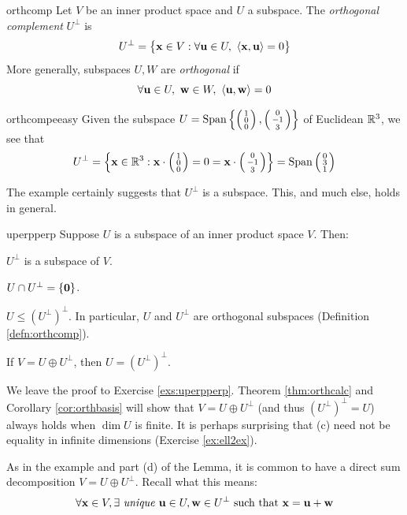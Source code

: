 \begin{defn}{}{orthcomp}
	Let $V$ be an inner product space and $U$ a subspace. The \emph{orthogonal complement} $U^\perp$ is
	\[
		U^\perp =\big\{{\mathbf{x}}\in V:\forall{\mathbf{u}}\in U,\ \left\langle {\mathbf{x}},{\mathbf{u}}\right\rangle=0\big\}
	\]
	More generally, subspaces $U,W$ are \emph{orthogonal} if
	\[
		\forall {\mathbf{u}}\in U,\ {\mathbf{w}}\in W,\ \left\langle {\mathbf{u}},{\mathbf{w}}\right\rangle=0
	\]
\end{defn}


\begin{example}{}{orthcompeeasy}
	Given the subspace $U=\operatorname{Span}\left\{\left(\begin{smallmatrix}1\\0\\0\end{smallmatrix}\right),\left(\begin{smallmatrix}0\\-1\\3\end{smallmatrix}\right)\right\}$ of Euclidean $\mathbb{R}^3$, we see that
	\[
		U^\perp
		=\left\{ {\mathbf{x}}\in\mathbb{R}^3:{\mathbf{x}}\cdot\left(\begin{smallmatrix}1\\0\\0\end{smallmatrix}\right)=0={\mathbf{x}}\cdot\left(\begin{smallmatrix}0\\-1\\3\end{smallmatrix}\right)\right\}
		=\operatorname{Span}\left(\begin{smallmatrix}0\\3\\1\end{smallmatrix}\right)
	\]
\end{example}

The example certainly suggests that $U^\perp$ is a subspace. This, and much else, holds in general.

\begin{lemm}{}{uperpperp}
	Suppose $U$ is a subspace of an inner product space $V$. Then:
	\begin{enumeratea}
    \item $U^\perp$ is a subspace of $V$.
    \item $U\cap U^\perp=\{\mathbf{0}\}$.
    \item $U\le (U^\perp)^\perp$. In particular, $U$ and $U^\perp$ are orthogonal subspaces (Definition \ref{defn:orthcomp}).
    \item If $V=U\oplus U^\perp$, then $U=(U^\perp)^\perp$.
	\end{enumeratea}
\end{lemm}

We leave the proof to Exercise \ref{exs:uperpperp}. Theorem \ref{thm:orthcalc} and Corollary \ref{cor:orthbasis} will show that $V=U\oplus U^\perp$ (and thus $(U^\perp)^\perp=U$) always holds when $\dim U$ is finite. It is perhaps surprising that (c) need not be equality in infinite dimensions (Exercise \ref{ex:ell2ex}).



As in the example and part (d) of the Lemma, it is common to have a direct sum decomposition $V=U\oplus U^\perp$. Recall what this means:
\[
	\forall {\mathbf{x}}\in V, \exists \text{ \emph{unique} }{\mathbf{u}}\in U,{\mathbf{w}}\in U^\perp \text{ such that }{\mathbf{x}}={\mathbf{u}}+{\mathbf{w}}
\]

